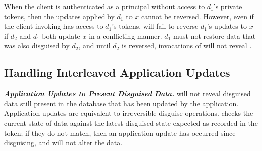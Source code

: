 When the client is authenticated as a principal without access to $d_1$'s private tokens, then the
updates applied by $d_1$ to $x$ cannot be reversed.  However, even if the client invoking 
has access to $d_1$'s tokens, \sys will fail to reverse $d_1$'s updates to $x$ if $d_2$ and $d_1$
both update $x$ in a conflicting manner. $d_1$ must not restore data that was also disguised by
$d_2$, and until $d_2$ is reversed, invocations of  will not reveal \xstart.

\iffalse
%
%

\subsection{Handling Interleaved Application Updates}
\noindent\textbf{\emph{Application Updates to Present Disguised Data.}}
\sys will not reveal disguised data still present in the database that has been updated by the
application. Application updates are equivalent to irreversible disguise operations.
\sys checks the current state of data against the latest disguised state
expected as recorded in the token; if they do not match, then an application update has occurred
since disguising, and \sys will not alter the data.

